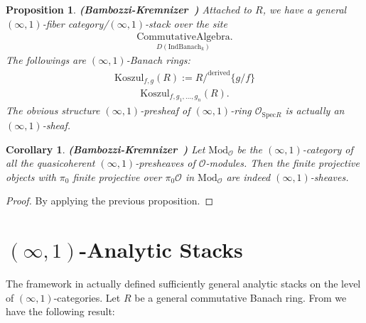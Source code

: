 \documentclass[12pt]{book}
\newtheorem{proposition}{Proposition}
\newtheorem{corollary}{Corollary}
\begin{document}
\begin{proposition} \mbox{\textbf{(Bambozzi-Kremnizer \cite[Definition 4.30, Proposition 4.33, Proposition 4.4]{BK})}}
Attached to $R$, we have a general $(\infty,1)$-fiber category/$(\infty,1)$-stack over the site 
\begin{align}
\underset{D(\mathrm{Ind}\mathrm{Banach}_k)}{\mathrm{CommutativeAlgebra}}.
\end{align}
The followings are $(\infty,1)$-Banach rings:
\begin{align}
\mathrm{Koszul}_{f,g}(R):=R/^\mathrm{derived}\{g/f\}
\end{align}
\begin{align}
\mathrm{Koszul}_{f,g_1,...,g_n}(R).
\end{align}
The obvious structure $(\infty,1)$-presheaf of $(\infty,1)$-ring $\mathcal{O}_{\mathrm{Spec}R}$ is actually an $(\infty,1)$-sheaf. 
\end{proposition}

\begin{corollary}\mbox{\textbf{(Bambozzi-Kremnizer \cite{BK})}}
Let $\mathrm{Mod}_\mathcal{O}$ be the $(\infty,1)$-category of all the quasicoherent $(\infty,1)$-presheaves of $\mathcal{O}$-modules. Then the finite projective objects with $\pi_0$ finite projective over $\pi_0\mathcal{O}$ in $\mathrm{Mod}_\mathcal{O}$ are indeed $(\infty,1)$-sheaves.
\end{corollary}

\begin{proof}
By applying the previous proposition.
\end{proof}



\newpage
\section{$(\infty,1)$-Analytic Stacks}

\indent The framework in \cite{BBBK} actually defined sufficiently general analytic stacks on the level of $(\infty,1)$-categories. Let $R$ be a general commutative Banach ring. From \cite{BBBK} we have the following result:
\end{document}
